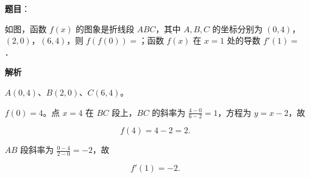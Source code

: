 \begin{answer}

\textbf{题目}：

如图，函数 $f(x)$ 的图象是折线段 $ABC$，其中 $A,B,C$ 的坐标分别为 $(0,4)$，$(2,0)$，$(6,4)$，则 $f(f(0))=$\gkblank{}；函数 $f(x)$ 在 $x=1$ 处的导数 $f'(1)=$\gkblank{}．
\nopagebreak[4]
\begin{center}\end{center}
\nopagebreak[4]
\textbf{解析}

$A(0,4)$、$B(2,0)$、$C(6,4)$。

$f(0)=4$。点 $x=4$ 在 $BC$ 段上，$BC$ 的斜率为 $\frac{4-0}{6-2}=1$，方程为 $y=x-2$，故

\nopagebreak[4]
\[f(4)=4-2=2 .\]

$AB$ 段斜率为 $\frac{0-4}{2-0}=-2$，故

\nopagebreak[4]
\[f'(1)=-2 .\]


\end{answer}
